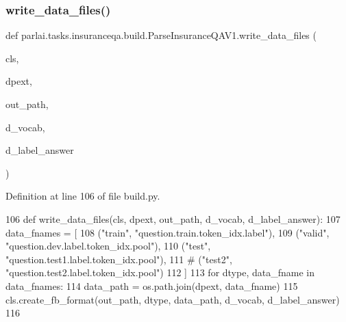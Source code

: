 \mbox{\label{classparlai_1_1tasks_1_1insuranceqa_1_1build_1_1ParseInsuranceQAV1_aec860cdc7404febddbbc3434828c74e3}} 
\subsubsection{\texorpdfstring{write\+\_\+data\+\_\+files()}{write\_data\_files()}}
{\footnotesize\ttfamily def parlai.\+tasks.\+insuranceqa.\+build.\+Parse\+Insurance\+Q\+A\+V1.\+write\+\_\+data\+\_\+files (\begin{DoxyParamCaption}\item[{}]{cls,  }\item[{}]{dpext,  }\item[{}]{out\+\_\+path,  }\item[{}]{d\+\_\+vocab,  }\item[{}]{d\+\_\+label\+\_\+answer }\end{DoxyParamCaption})}



Definition at line 106 of file build.\+py.


\begin{DoxyCode}
106     \textcolor{keyword}{def }write\_data\_files(cls, dpext, out\_path, d\_vocab, d\_label\_answer):
107         data\_fnames = [
108             (\textcolor{stringliteral}{"train"}, \textcolor{stringliteral}{"question.train.token\_idx.label"}),
109             (\textcolor{stringliteral}{"valid"}, \textcolor{stringliteral}{"question.dev.label.token\_idx.pool"}),
110             (\textcolor{stringliteral}{"test"}, \textcolor{stringliteral}{"question.test1.label.token\_idx.pool"}),
111             \textcolor{comment}{# ("test2", "question.test2.label.token\_idx.pool")}
112         ]
113         \textcolor{keywordflow}{for} dtype, data\_fname \textcolor{keywordflow}{in} data\_fnames:
114             data\_path = os.path.join(dpext, data\_fname)
115             cls.create\_fb\_format(out\_path, dtype, data\_path, d\_vocab, d\_label\_answer)
116 
\end{DoxyCode}


